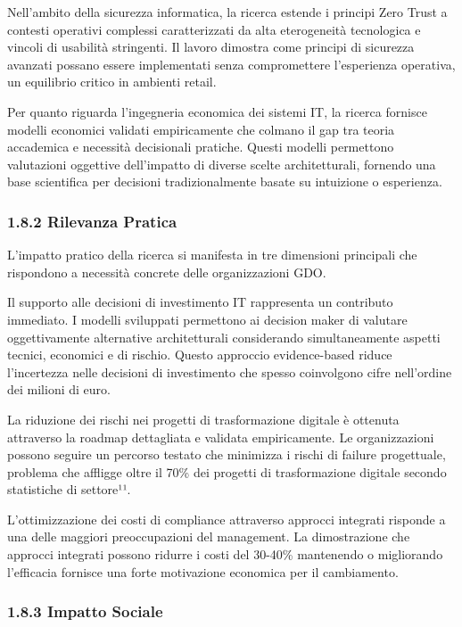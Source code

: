 \documentclass{report}
\begin{document}
Nell'ambito della sicurezza informatica, la ricerca estende i principi
Zero Trust a contesti operativi complessi caratterizzati da alta
eterogeneità tecnologica e vincoli di usabilità stringenti. Il lavoro
dimostra come principi di sicurezza avanzati possano essere implementati
senza compromettere l'esperienza operativa, un equilibrio critico in
ambienti retail.

Per quanto riguarda l'ingegneria economica dei sistemi IT, la ricerca
fornisce modelli economici validati empiricamente che colmano il gap tra
teoria accademica e necessità decisionali pratiche. Questi modelli
permettono valutazioni oggettive dell'impatto di diverse scelte
architetturali, fornendo una base scientifica per decisioni
tradizionalmente basate su intuizione o esperienza.

\subsubsection{\texorpdfstring{\textbf{1.8.2 Rilevanza
Pratica}}{1.8.2 Rilevanza Pratica}}\label{rilevanza-pratica}

L'impatto pratico della ricerca si manifesta in tre dimensioni
principali che rispondono a necessità concrete delle organizzazioni GDO.

Il supporto alle decisioni di investimento IT rappresenta un contributo
immediato. I modelli sviluppati permettono ai decision maker di valutare
oggettivamente alternative architetturali considerando simultaneamente
aspetti tecnici, economici e di rischio. Questo approccio evidence-based
riduce l'incertezza nelle decisioni di investimento che spesso
coinvolgono cifre nell'ordine dei milioni di euro.

La riduzione dei rischi nei progetti di trasformazione digitale è
ottenuta attraverso la roadmap dettagliata e validata empiricamente. Le
organizzazioni possono seguire un percorso testato che minimizza i
rischi di failure progettuale, problema che affligge oltre il 70\% dei
progetti di trasformazione digitale secondo statistiche di settore¹¹.

L'ottimizzazione dei costi di compliance attraverso approcci integrati
risponde a una delle maggiori preoccupazioni del management. La
dimostrazione che approcci integrati possono ridurre i costi del 30-40\%
mantenendo o migliorando l'efficacia fornisce una forte motivazione
economica per il cambiamento.

\subsubsection{\texorpdfstring{\textbf{1.8.3 Impatto
Sociale}}{1.8.3 Impatto Sociale}}\label{impatto-sociale}
\end{document}

